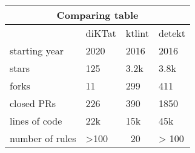 \begin{center}
\begin{tabular}{ |p{3cm}|p{3cm}|p{3cm}|p{3cm}|  }
\hline
\multicolumn{4}{|c|}{\textbf{Comparing table}} \\
\hline
& diKTat& ktlint &detekt \\
\hline
starting year & 2020 & 2016 & 2016 \\
stars & 125 & 3.2k & 3.8k \\ 
forks & 11 & 299 & 411 \\
closed PRs & 226 & 390 & 1850 \\
lines of code & 22k & 15k & 45k \\
number of rules & >100 & ~20 & > 100 \\
\hline

\hline
\end{tabular}
\end{center}